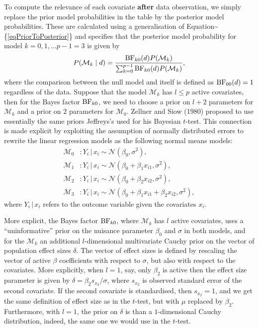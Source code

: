 \documentclass[english,,doc,floatsintext]{apa6}
\begin{document}
To compute the relevance of each covariate \textbf{after} data observation, we simply replace the prior model probabilities in the table by the posterior model probabilities. These are calculated using a generalisation of Equation\textasciitilde{}\{\eqref{eqPriorToPosterior}\} and specifies that the posterior model probability for model \(k=0, 1, \ldots p-1 = 3\) is given by
\begin{align}
\label{eqPriorToPosteriorGeneral}
P(\mathcal{M}_{k} \mid d) = \frac{ \textnormal{BF}_{k0}(d) P(\mathcal{M}_{k})}{ \sum_{k=0}^{p-1} \textnormal{BF}_{k0}(d) P(\mathcal{M}_{k})},
\end{align}
where the comparison between the null model and itself is defined as \(\textnormal{BF}_{00}(d) = 1\) regardless of the data. Suppose that the model \(\mathcal{M}_{k}\) has \(l \leq p\) active covariates, then for the Bayes factor \(\textnormal{BF}_{k0}\), we need to choose a prior on \(l + 2\) parameters for \(\mathcal{M}_{k}\) and a prior on \(2\) parameters for \(\mathcal{M}_{0}\). Zellner and Siow (1980) proposed to use essentially the same priors Jeffreys's used for his Bayesian \(t\)-test. This connection is made explicit by exploiting the assumption of normally distributed errors to rewrite the linear regression models as the following normal means models:
\begin{align}
\label{eqLinRegAsNormal0}
\mathcal{M}_{0} & : Y_{i} \, | \, x_{i} \sim \mathcal{N}(\beta_{0}, \sigma^{2}), \\
\mathcal{M}_{1} & : Y_{i} \, | \, x_{i} \sim \mathcal{N}(\beta_{0} + \beta_{1} x_{i1}, \sigma^{2}), \\
\mathcal{M}_{2} & : Y_{i} \, | \, x_{i} \sim \mathcal{N}(\beta_{0} + \beta_{2} x_{i2}, \sigma^{2}), \\
\label{eqLinRegAsNormal3}
\mathcal{M}_{3} & : Y_{i} \, | \, x_{i} \sim \mathcal{N}(\beta_{0} + \beta_{1} x_{i1} + \beta_{2} x_{i2} , \sigma^{2}), 
\end{align}
where \(Y_{i} \, | \, x_{i}\) refers to the outcome variable given the covariates \(x_{i}\).

More explicit, the Bayes factor \(\textnormal{BF}_{k0}\), where \(\mathcal{M}_{k}\) has \(l\) active covariates, uses a \enquote{uninformative} prior on the nuisance parameter \(\beta_{0}\) and \(\sigma\) in both models, and for the \(\mathcal{M}_{k}\) an additional \(l\)-dimensional multivariate Cauchy prior on the vector of population effect sizes \(\delta\). The vector of effect sizes is defined by rescaling the vector of active \(\beta\) coefficients with respect to \(\sigma\), but also with respect to the covariates. More explicitly, when \(l=1\), say, only \(\beta_{2}\) is active then the effect size parameter is given by \(\delta = \beta_{2} s_{x_{2}}/\sigma\), where \(s_{x_{2}}\) is observed standard error of the second covariate. If the second covariate is standardised, then \(s_{x_{2}} = 1\), and we get the same definition of effect size as in the \(t\)-test, but with \(\mu\) replaced by \(\beta_{2}\). Furthermore, with \(l = 1\), the prior on \(\delta\) is than a \(1\)-dimensional Cauchy distribution, indeed, the same one we would use in the \(t\)-test.
\end{document}
